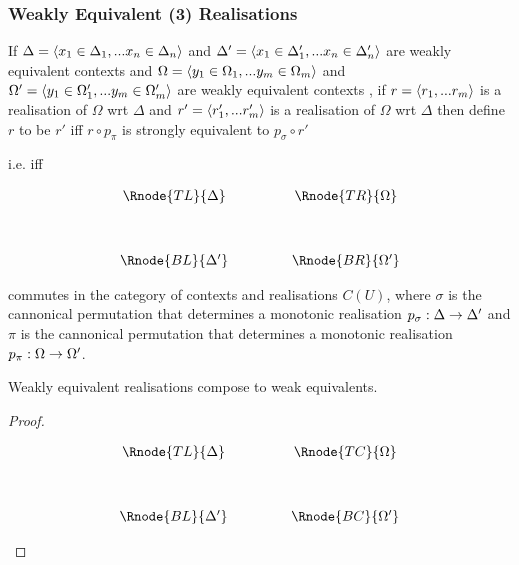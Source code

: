 \documentclass[10pt,a4paper]{scrartcl}
\begin{document}
\subsubsection{Weakly Equivalent (3) Realisations}
\begin{definition}
If $\Delta=\langle x_1 \in \Delta_1,... x_{n} \in \Delta_{n}\rangle$ and $\Delta'=\langle x_1 \in \Delta'_1,... x_{n} \in \Delta'_{n}\rangle$ are weakly equivalent 
contexts \inagat \gat and $\Omega=\langle y_1 \in \Omega_1,... y_{m} \in \Omega_{m}\rangle$ and $\Omega'=\langle y_1 \in \Omega'_1,... y_{m} \in \Omega'_{m}\rangle$ are weakly equivalent contexts \ingat,
if $r=\langle r_1,...r_m\rangle$ is a realisation of $\Omega$ wrt $\Delta$ 
and $r'=\langle r'_1,...r'_m\rangle$ is a realisation of $\Omega$ wrt $\Delta$ 
then
define $r$ to be  $r'$ 
iff $r \circ p_\pi$ is strongly equivalent to $p_\sigma \circ r'$

i.e. iff
\vspace{3mm}
\begin{center}
\begin{displaymath}
\begin{array}{cp{.9cm}c}
\Rnode{TL}{\Delta} & & \Rnode{TR}{\Omega}\\ [1.2cm]
\Rnode{BL}{\Delta'}         & & \Rnode{BR}{\Omega'}
\end{array}
\end{displaymath}
\alabel{[r]}
\blabel{[p_\sigma]}
\blabel{[r']}
\alabel{[p_\pi]}
\end{center} commutes
in the category of contexts and realisations $C(U)$,
where $\sigma$ is the cannonical permutation  that determines a monotonic realisation $p_\sigma: \Delta \rightarrow \Delta'$ 
and  $\pi$ is the cannonical permutation  that determines a monotonic realisation $p_\pi: \Omega \rightarrow \Omega'$.
\end{definition}

\begin{lemma}
Weakly equivalent realisations compose to weak equivalents.
\end{lemma}
\begin{proof} 
\begin{center}
\begin{displaymath}
\begin{array}{cp{.9cm}c}
\Rnode{TL}{\Delta} & & \Rnode{TC}{\Omega}\\ [1.2cm]
\Rnode{BL}{\Delta'}         & & \Rnode{BC}{\Omega'}
\end{array}
\end{displaymath}
\alabel{[r]}
\blabel{[p_\sigma]}
\blabel{[r']}
\alabel{[p_\pi]}
\end{center}
\end{proof}
\end{document}
